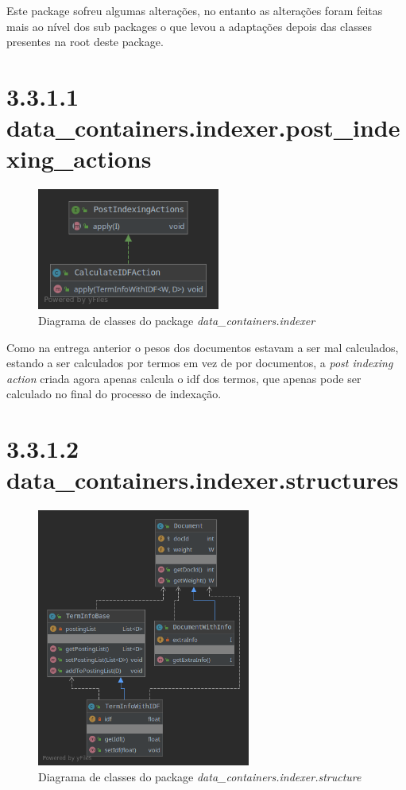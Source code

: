 \documentclass[12pt]{article}
\begin{document}
Este package sofreu algumas alterações, no entanto as alterações
foram feitas mais ao nível dos sub packages o que levou a adaptações
depois das classes presentes na root deste package.

\section*{3.3.1.1 data\_containers.indexer.post\_indexing\_actions}
\begin{figure}[h]
  \center
   \includegraphics[width=6cm]{packages_data_containers_indexer_post_indexing_actions.png}
  \caption{Diagrama de classes do package \it
    data\_containers.indexer}
\end{figure}

Como na entrega anterior o pesos dos documentos estavam a ser mal
calculados, estando a ser calculados por termos em vez de por
documentos, a {\it post indexing action} criada agora apenas calcula
o idf dos termos, que apenas pode ser calculado no final do processo
de indexação.

\section*{3.3.1.2 data\_containers.indexer.structures}
\begin{figure}[H]
  \center
   \includegraphics[width=7cm]{packages_data_containers_indexer_structures.png}
  \caption{Diagrama de classes do package \it
    data\_containers.indexer.structure}
\end{figure}
\end{document}
